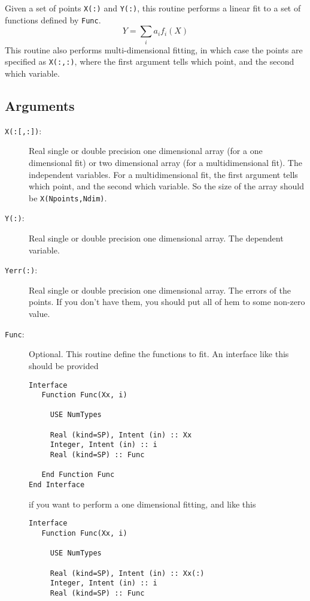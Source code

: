 Given a set of points \texttt{X(:)} and \texttt{Y(:)}, this routine
performs a linear fit to a set of functions defined by
\texttt{Func}. 
\begin{displaymath}
  Y = \sum_i a_i f_i(X)
\end{displaymath}
This routine also performs multi-dimensional fitting, in which case
the points are specified as \texttt{X(:,:)}, where the first argument
tells which point, and the second which variable.

\subsection{Arguments}

\begin{description}
\item[\texttt{X(:[,:])}:] Real single or double precision one
  dimensional array (for a one dimensional fit) or two dimensional
  array (for a multidimensional fit). The
  independent variables. For a multidimensional fit, the first argument
  tells which point, and the second which variable. So the size of the
  array should be \texttt{X(Npoints,Ndim)}.
\item[\texttt{Y(:)}: ] Real single or double precision one dimensional
  array. The dependent
  variable.
\item[\texttt{Yerr(:)}:] Real single or double precision one
  dimensional array. The errors
  of the points. If you don't have them, you should put all of hem to
  some non-zero value.
\item[\texttt{Func}:] Optional. This routine define the functions to
  fit. An interface like this should be provided
\begin{verbatim}
Interface
   Function Func(Xx, i)
         
     USE NumTypes

     Real (kind=SP), Intent (in) :: Xx
     Integer, Intent (in) :: i
     Real (kind=SP) :: Func

   End Function Func
End Interface
\end{verbatim}
if you want to perform a one dimensional fitting, and like this
\begin{verbatim}
Interface
   Function Func(Xx, i)
         
     USE NumTypes

     Real (kind=SP), Intent (in) :: Xx(:)
     Integer, Intent (in) :: i
     Real (kind=SP) :: Func


\end{verbatim}
\end{description}
